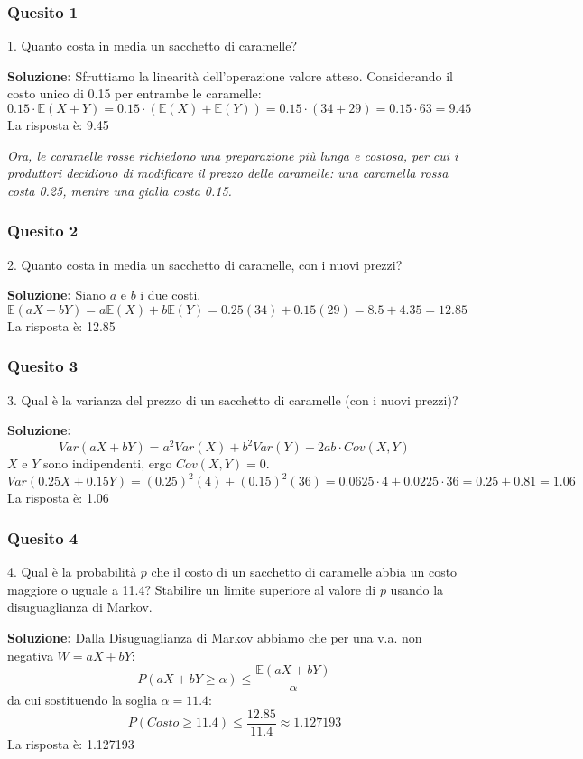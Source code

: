 \documentclass[12pt, a4paper]{article}
\begin{document}
\subsubsection*{Quesito 1}
1. Quanto costa in media un sacchetto di caramelle?

\textbf{Soluzione:}
Sfruttiamo la linearità dell'operazione valore atteso. Considerando il costo unico di 0.15 per entrambe le caramelle:
$$ 0.15 \cdot \mathbb{E}(X+Y) = 0.15 \cdot (\mathbb{E}(X)+\mathbb{E}(Y)) = 0.15 \cdot (34 + 29) = 0.15 \cdot 63 = 9.45 $$
La risposta è: 9.45

\vspace{0.3cm}
\textit{Ora, le caramelle rosse richiedono una preparazione più lunga e costosa, per cui i produttori decidiono di modificare il prezzo delle caramelle: una caramella rossa costa 0.25, mentre una gialla costa 0.15.}

\subsubsection*{Quesito 2}
2. Quanto costa in media un sacchetto di caramelle, con i nuovi prezzi?

\textbf{Soluzione:}
Siano $a$ e $b$ i due costi.
$$ \mathbb{E}(aX+bY) = a\mathbb{E}(X) + b\mathbb{E}(Y) = 0.25(34) + 0.15(29) = 8.5 + 4.35 = 12.85 $$
La risposta è: 12.85

\subsubsection*{Quesito 3}
3. Qual è la varianza del prezzo di un sacchetto di caramelle (con i nuovi prezzi)?

\textbf{Soluzione:}
$$ Var(aX+bY) = a^2 Var(X) + b^2 Var(Y) + 2ab \cdot Cov(X,Y) $$
$X$ e $Y$ sono indipendenti, ergo $Cov(X,Y)=0$.
$$ Var(0.25X + 0.15Y) = (0.25)^2 (4) + (0.15)^2 (36) = 0.0625 \cdot 4 + 0.0225 \cdot 36 = 0.25 + 0.81 = 1.06 $$
La risposta è: 1.06

\subsubsection*{Quesito 4}
4. Qual è la probabilità $p$ che il costo di un sacchetto di caramelle abbia un costo maggiore o uguale a 11.4? Stabilire un limite superiore al valore di $p$ usando la disuguaglianza di Markov.

\textbf{Soluzione:}
Dalla Disuguaglianza di Markov abbiamo che per una v.a. non negativa $W = aX+bY$:
$$ P(aX+bY \geq \alpha) \leq \frac{\mathbb{E}(aX+bY)}{\alpha} $$
da cui sostituendo la soglia $\alpha = 11.4$:
$$ P(Costo \geq 11.4) \leq \frac{12.85}{11.4} \approx 1.127193 $$
La risposta è: 1.127193
\end{document}
